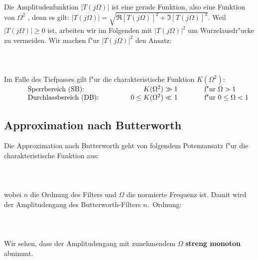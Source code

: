 \nit Die Amplitudenfunktion $|T(j\Omega)|$ ist eine gerade Funktion, also
eine Funktion von $\Omega^{2}$ \cite{MOS:89}, denn es gilt:
$|T(j\Omega)|=\sqrt{\Re [T(j\Omega)]^{2}+\Im [T(j\Omega)]^{2}}$. Weil
$|T(j\Omega)| \geq 0$ ist, arbeiten wir im Folgenden mit
$|T(j\Omega)|^{2}$ um Wurzelausdr"ucke zu vermeiden.
Wir machen f"ur $|T(j\Omega)|^{2}$ den Ansatz:\\~\\
\\~~\\
\nit Im Falle des Tiefpasses gilt f"ur die charakteristische Funktion $K(\Omega^{2})$:\\
$
\begin{array}{lrl}
\hspace*{1cm}\mbox{Sperrbereich (SB):}\hspace{2cm}& K(\Omega^{2})\gg 1 &\hspace{1cm}\mbox{f"ur } \Omega>1 \\
\hspace*{1cm}\mbox{Durchlassbereich (DB):} & 0\leq K(\Omega^{2})\ll 1 &\hspace{1cm}\mbox{f"ur } 0\leq\Omega<1
\end{array}
$
\subsection{Approximation nach Butterworth}
Die Approximation nach Butterworth geht von
folgendem Potenzansatz f"ur die
charakteristische Funktion aus:\\~~\\
\\~~\\ 
\nit wobei $n$ die Ordnung des Filters und $\Omega$ die normierte Frequenz ist.
Damit wird der Amplitudengang des Butterworth-Filters $n$.~Ordnung:\\~~\\
\\~~\\
\nit Wir sehen, dass der Amplitudengang mit zunehmendem $\Omega$ {\bf streng monoton} abnimmt.

